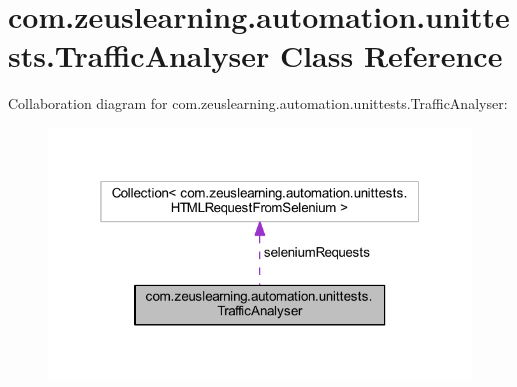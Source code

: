 \hypertarget{classcom_1_1zeuslearning_1_1automation_1_1unittests_1_1TrafficAnalyser}{}\section{com.\+zeuslearning.\+automation.\+unittests.\+Traffic\+Analyser Class Reference}
\label{classcom_1_1zeuslearning_1_1automation_1_1unittests_1_1TrafficAnalyser}


Collaboration diagram for com.\+zeuslearning.\+automation.\+unittests.\+Traffic\+Analyser\+:\nopagebreak
\begin{figure}[H]
\begin{center}
\leavevmode
\includegraphics[width=319pt]{d0/d41/classcom_1_1zeuslearning_1_1automation_1_1unittests_1_1TrafficAnalyser__coll__graph}
\end{center}
\end{figure}
